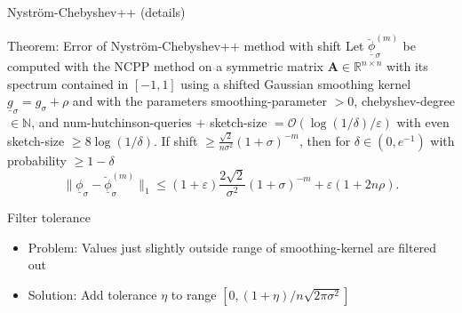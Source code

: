 \documentclass[aspectratio=169, leqno, 12pt]{beamer}
\newcommand{\mtx}[1]{\boldsymbol{#1}}
\DeclareMathOperator{\Tr}{Tr}
\begin{document}
\begin{frame}{Nystr\"om-Chebyshev++ (details)}
    \begin{block}{Theorem: Error of Nystr\"om-Chebyshev++ method with shift}
        Let $\breve{\underline{\phi}}_{\sigma}^{(m)}$ be computed with the
        \gls{NCPP} method on a symmetric matrix
        $\mtx{A} \in \mathbb{R}^{n \times n}$ with its spectrum contained in $[-1, 1]$
        using a shifted Gaussian smoothing kernel $\underline{g}_{\sigma} = g_{\sigma} + \rho$
        and with the parameters \gls{smoothing-parameter} $>0$, \gls{chebyshev-degree} $\in \mathbb{N}$, and
        \gls{num-hutchinson-queries} $+$ \gls{sketch-size} $=\mathcal{O}(\log(1/\delta)/\varepsilon)$
        with even \gls{sketch-size} $\geq 8 \log(1/\delta)$.
        If \gls{shift} $\geq \frac{\sqrt{2}}{n\sigma^2} (1 + \sigma)^{-m}$, then
        for $\delta \in (0, e^{-1})$ with probability $\geq 1-\delta$
        \begin{equation}
            \lVert \underline{\phi}_{\sigma} - \breve{\underline{\phi}}_{\sigma}^{(m)} \rVert _1
            \leq (1 + \varepsilon)  \frac{2\sqrt{2}}{\sigma^2} (1 + \sigma)^{-m} + \varepsilon(1 + 2 n \rho).
        \end{equation}
    \end{block}
\end{frame}

\begin{frame}{Filter tolerance}
    \begin{itemize}
        \item Problem: Values just slightly outside range of \gls{smoothing-kernel} are filtered out%
        \item Solution: Add tolerance $\eta$ to range $[0, (1 + \eta)/n\sqrt{2\pi\sigma^2}]$
    \end{itemize}
    \centering
    \scalebox{0.8}{}
\end{frame}
\end{document}
